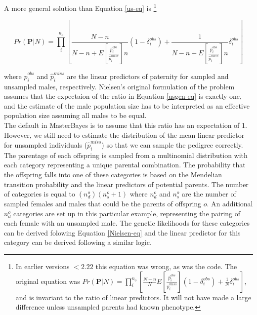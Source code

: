 \documentclass{article}
\begin{document}
A more general solution than Equation \ref{us-eq} is \footnote{In earlier versions $<2.22$ this equation was wrong, as was the code. The original equation was $Pr(\bm{P}|N)  = \prod^{n_{o}}_{i}\left[\frac{N-n}{N}E\left[\frac{\hat{p}^{obs}_{i}}{\hat{p}^{miss}_{i}}\right](1-\delta^{obs}_{i})+\frac{1}{N}\delta^{obs}_{i}\right]$, and is invariant to the ratio of linear predictors. It will not have made a large difference unless unsampled parents had known phenotype.}

\begin{equation}
Pr(\bm{P}|N)  = \prod^{n_{o}}_{i}\left[\frac{N-n}{N-n+E\left[\frac{\hat{p}^{obs}_{i}}{\hat{p}^{miss}_{i}}\right]n}(1-\delta^{obs}_{i})+\frac{1}{N-n+E\left[\frac{\hat{p}^{obs}_{i}}{\hat{p}^{miss}_{i}}\right]n}\delta^{obs}_{i}\right]
\label{usgen-eq}
\end{equation}

where $\hat{p}^{obs}_{i}$ and $\hat{p}^{miss}_{i}$ are the linear predictors of paternity for sampled and unsampled males, respectively.  Nielsen's original formulation of the problem assumes that the expectaion of the ratio in Equation \ref{usgen-eq} is exactly one, and the estimate of the male population size has to be interpreted as an effective population size assuming all males to be equal.\\

The default in MasterBayes is to assume that this ratio has an expectation of 1.  However, we still need to estimate the distribution of the mean linear predictor for unsampled individuals ($\hat{p}^{miss}_{i}$) so that we can sample the pedigree correctly.\\

The parentage of each offspring is sampled from a multinomial distribution with each category representing a unique parental combination.  The probability that the offspring falls into one of these categories is based on the Mendelian transition probability and the linear predictors of potential parents.  The number of categories is equal to $(n^{o}_{d})(n^{o}_{s}+1)$ where $n^{o}_{d}$ and $n^{o}_{s}$ are the number of sampled females and males that could be the parents of offspring $o$.  An additional $n^{o}_{d}$ categories are set up in this particular example, representing the pairing of each female with an unsampled male.  The genetic likelihoods for these categories can be derived folowing Equation \ref{Nielsen-eq} and the linear predictor for this category can be derived following a similar logic.\\   
\end{document}
